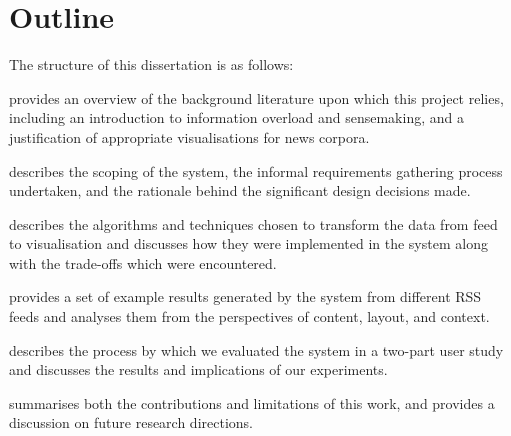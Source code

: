 \section*{Outline}
The structure of this dissertation is as follows: \vspace{-0.1cm}
\begin{description}[leftmargin=5.58em,style=nextline]
	\item [Chapter \ref{c:litreview}] provides an overview of the background literature upon which this project relies, including an introduction to information overload and sensemaking, and a justification of appropriate visualisations for news corpora.
	\item [Chapter \ref{c:reqs}] describes the scoping of the system, the informal requirements gathering process undertaken, and the rationale behind the significant design decisions made.
	\item [Chapter \ref{c:implementation}] describes the algorithms and techniques chosen to transform the data from feed to visualisation and discusses how they were implemented in the system along with the trade-offs which were encountered.
	\item [Chapter \ref{c:results}] provides a set of example results generated by the system from different RSS feeds and analyses them from the perspectives of content, layout, and context.
	\item [Chapter \ref{c:evaluation}] describes the process by which we evaluated the system in a two-part user study and discusses the results and implications of our experiments.
	\item [Chapter \ref{c:conclusions}] summarises both the contributions and limitations of this work, and provides a discussion on future research directions.
\end{description}

